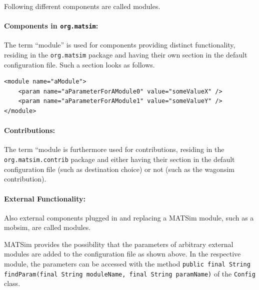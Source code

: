 Following different components are called modules.

\paragraph{Components in \lstinline|org.matsim|:} %
The term ``module'' is used for components providing distinct functionality, residing in the \lstinline|org.matsim| package and having their own section in the default configuration file. Such a section looks as follows.
\begin{lstlisting}
<module name="aModule">
    <param name="aParameterForAModule0" value="someValueX" />
    <param name="aParameterForAModule1" value="someValueY" />
</module>
\end{lstlisting}

\paragraph{Contributions:} %
The term ``module is furthermore used for contributions, residing in the \lstinline|org.matsim.contrib| package and either having their section in the default configuration file (such as destination choice) or not (such as the wagonsim contribution).




\paragraph{External Functionality:} %
Also external components plugged in and replacing a MATSim module, such as a mobsim, are called modules.

MATSim provides the possibility that the parameters of arbitrary external modules are added to the configuration file as shown above. In the respective module, the parameters can be accessed with the method \lstinline|public final String findParam(final String moduleName, final String paramName)| of the \lstinline|Config| class.

